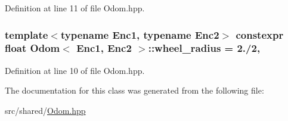Definition at line 11 of file Odom.\-hpp.

\hypertarget{classOdom_a567d0fcf68e65948aed27f27f35e6973}{
\subsubsection[{wheel\-\_\-radius}]{\setlength{\rightskip}{0pt plus 5cm}template$<$typename Enc1, typename Enc2$>$ constexpr float {\bf Odom}$<$ Enc1, Enc2 $>$\-::wheel\-\_\-radius = 2./2\hspace{0.3cm}{\ttfamily [static]}, {\ttfamily [private]}}}\label{classOdom_a567d0fcf68e65948aed27f27f35e6973}


Definition at line 10 of file Odom.\-hpp.



The documentation for this class was generated from the following file\-:\begin{DoxyCompactItemize}
\item 
src/shared/\hyperlink{Odom_8hpp}{Odom.\-hpp}\end{DoxyCompactItemize}
